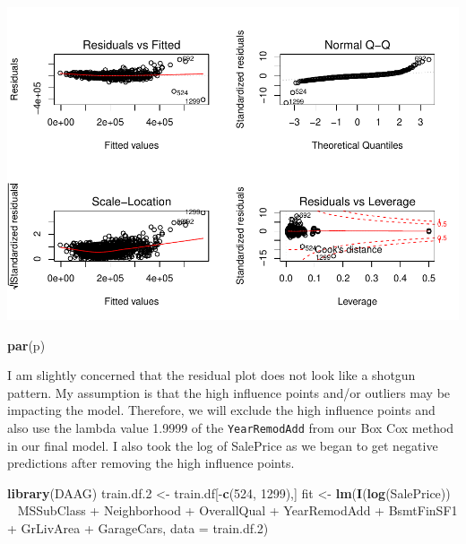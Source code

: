 \documentclass[]{article}
\newenvironment{Shaded}{\begin{snugshade}}{\end{snugshade}}
\newcommand{\KeywordTok}[1]{\textcolor[rgb]{0.13,0.29,0.53}{\textbf{{#1}}}}
\newcommand{\DataTypeTok}[1]{\textcolor[rgb]{0.13,0.29,0.53}{{#1}}}
\newcommand{\DecValTok}[1]{\textcolor[rgb]{0.00,0.00,0.81}{{#1}}}
\newcommand{\FloatTok}[1]{\textcolor[rgb]{0.00,0.00,0.81}{{#1}}}
\newcommand{\StringTok}[1]{\textcolor[rgb]{0.31,0.60,0.02}{{#1}}}
\newcommand{\NormalTok}[1]{{#1}}
\begin{document}
\includegraphics{Final_Project_files/figure-latex/unnamed-chunk-21-1.pdf}

\begin{Shaded}
\begin{Highlighting}[]
\KeywordTok{par}\NormalTok{(p)}
\end{Highlighting}
\end{Shaded}

I am slightly concerned that the residual plot does not look like a
shotgun pattern. My assumption is that the high influence points and/or
outliers may be impacting the model. Therefore, we will exclude the high
influence points and also use the lambda value 1.9999 of the
\texttt{YearRemodAdd} from our Box Cox method in our final model. I also
took the log of SalePrice as we began to get negative predictions after
removing the high influence points.

\begin{Shaded}
\begin{Highlighting}[]
\KeywordTok{library}\NormalTok{(DAAG)}
\NormalTok{train.df}\FloatTok{.2} \NormalTok{<-}\StringTok{ }\NormalTok{train.df[-}\KeywordTok{c}\NormalTok{(}\DecValTok{524}\NormalTok{, }\DecValTok{1299}\NormalTok{),]}
\NormalTok{fit <-}\StringTok{ }\KeywordTok{lm}\NormalTok{(}\KeywordTok{I}\NormalTok{(}\KeywordTok{log}\NormalTok{(SalePrice)) ~}\StringTok{ }\NormalTok{MSSubClass +}\StringTok{ }\NormalTok{Neighborhood +}\StringTok{ }
\StringTok{            }\NormalTok{OverallQual +}\StringTok{ }\NormalTok{YearRemodAdd +}\StringTok{ }\NormalTok{BsmtFinSF1 +}\StringTok{ }
\StringTok{            }\NormalTok{GrLivArea +}\StringTok{ }\NormalTok{GarageCars, }\DataTypeTok{data =} \NormalTok{train.df}\FloatTok{.2}\NormalTok{)}
\end{Highlighting}
\end{Shaded}
\end{document}
